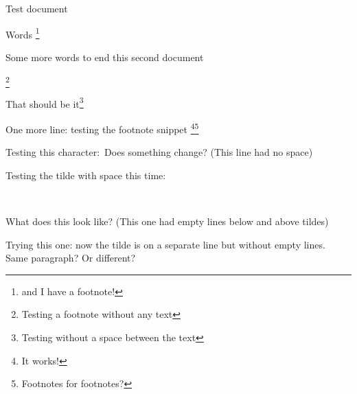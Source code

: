 \documentclass[a4paper, 12pt]{article}
\begin{document}
Test document

Words \footnote{and I have a footnote!}

Some more words to end this second document

\footnote{Testing a footnote without any text}

That should be it\footnote{Testing without a space between the text}

One more line: testing the footnote snippet \footnote{It works!}\footnote{Footnotes for footnotes?} 

Testing this character:~Does something change? (This line had no space)

Testing the tilde with space this time:

~

What does this look like? (This one had empty lines below and above tildes)

Trying this one: now the tilde is on a separate line but without empty lines.~ 
Same paragraph? Or different?
\end{document}
